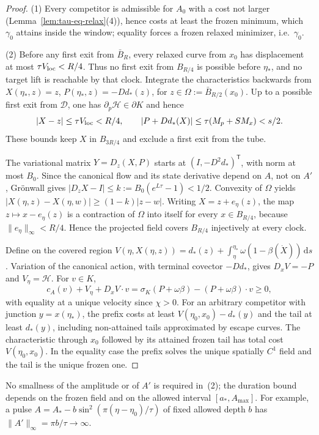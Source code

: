 \documentclass[aip,jmp,amsmath,amssymb,reprint]{revtex4-2}
\newcommand{\dd}{\mathrm{d}}
\theoremstyle{plain}
\theoremstyle{definition}
\begin{document}
\begin{proof}
(1) Every competitor is admissible for $A_0$ with a cost not larger
(Lemma~\ref{lem:tau-eq-relax}(4)), hence costs at least the frozen minimum, which $\gamma_0$ attains
inside the window; equality forces a frozen relaxed minimizer, i.e.\ $\gamma_0$.

(2) Before any first exit from $\bar B_R$, every relaxed curve from $x_0$ has displacement at most
$\tau V_{\rm loc}<R/4$. Thus no first exit from $B_{R/4}$ is possible before $\eta_*$, and no target lift
is reachable by that clock. Integrate the characteristics backwards from $X(\eta_*,z)=z$,
$P(\eta_*,z)=-Dd_*(z)$, for $z\in\Omega:=\bar B_{R/2}(x_0)$. Up to a possible first exit from $\mathcal D$,
one has $\partial_p\mathcal H\in\partial K$ and hence
\[
  |X-z|\le\tau V_{\rm loc}<R/4,\qquad |P+Dd_*(X)|\le\tau(M_p+SM_x)<s/2 .
\]
These bounds keep $X$ in $B_{3R/4}$ and exclude a first exit from the tube.

The variational matrix $Y=D_z(X,P)$ starts at $(I,-D^2d_*)^{\mathsf T}$, with norm at most $B_0$. Since
the canonical flow and its state derivative depend on $A$, not on $A'$, Gr\"onwall gives
$|D_zX-I|\le k:=B_0(e^{L\tau}-1)<1/2$. Convexity of $\Omega$ yields $|X(\eta,z)-X(\eta,w)|\ge(1-k)|z-w|$.
Writing $X=z+e_\eta(z)$, the map $z\mapsto x-e_\eta(z)$ is a contraction of $\Omega$ into itself for every
$x\in B_{R/4}$, because $\|e_\eta\|_\infty<R/4$. Hence the projected field covers $B_{R/4}$ injectively at
every clock.

Define on the covered region $V(\eta,X(\eta,z))=d_*(z)+\int_\eta^{\eta_*}\omega(1-\beta(\dot X))\,\dd s$.
Variation of the canonical action, with terminal covector $-Dd_*$, gives $D_xV=-P$ and $V_\eta=\mathcal H$.
For $v\in K$,
\[
  c_A(v)+V_\eta+D_xV\cdot v=\sigma_K(P+\omega\beta)-(P+\omega\beta)\cdot v\ge0,
\]
with equality at a unique velocity since $\chi>0$. For an arbitrary competitor with junction
$y=x(\eta_*)$, the prefix costs at least $V(\eta_0,x_0)-d_*(y)$ and the tail at least $d_*(y)$,
including non-attained tails approximated by escape curves. The characteristic through $x_0$
followed by its attained frozen tail has total cost $V(\eta_0,x_0)$. In the equality case the
prefix solves the unique spatially $C^1$ field and the tail is the unique frozen one.
\end{proof}

No smallness of the amplitude or of $A'$ is required in~(2); the duration bound depends on the
frozen field and on the allowed interval $[a_*,A_{\max}]$. For example, a pulse
$A=A_*-b\sin^2(\pi(\eta-\eta_0)/\tau)$ of fixed allowed depth $b$ has $\|A'\|_\infty=\pi b/\tau\to\infty$.
\end{document}
